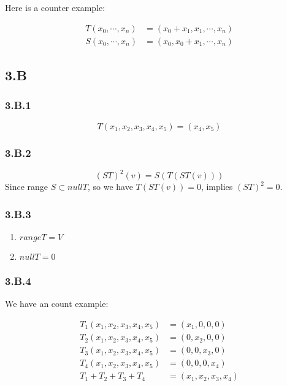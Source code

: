 Here is a counter example:

\begin{equation*}
    \begin{split}
T(x_{0}, \cdots, x_{n}) &= (x_{0}+x_{1}, x_{1}, \cdots, x_{n}) \\
S(x_{0}, \cdots, x_{n}) &= (x_{0}, x_{0}+ x_{1}, \cdots, x_{n})
\end{split}
\end{equation*}

\subsection*{3.B}
\subsubsection*{3.B.1}

\[T(x_{1}, x_{2}, x_{3}, x_{4}, x_{5}) = (x_{4}, x_{5})\]

\subsubsection*{3.B.2}
\[(ST)^{2}(v) = S(T(ST(v)))\]
Since range $S\subset null T$, so we have $T(ST(v)) = 0$, implies $(ST)^{2} = 0$.

\subsubsection*{3.B.3}

\begin{enumerate}[label=(\alph*)]
\item $range T = V$
\item $null T = 0$
\end{enumerate}


\subsubsection*{3.B.4}

We have an count example:

\begin{equation*}
    \begin{split}
T_{1}(x_{1}, x_{2}, x_{3}, x_{4}, x_{5}) &= (x_{1}, 0, 0, 0) \\
T_{2}(x_{1}, x_{2}, x_{3}, x_{4}, x_{5}) &= (0, x_{2}, 0, 0) \\
T_{3}(x_{1}, x_{2}, x_{3}, x_{4}, x_{5}) &= (0, 0, x_{3}, 0) \\
T_{4}(x_{1}, x_{2}, x_{3}, x_{4}, x_{5}) &= (0, 0, 0, x_{4}) \\
T_{1} + T_{2} + T_{3} + T_{4} &= (x_{1}, x_{2}, x_{3}, x_{4})
\end{split}
\end{equation*}

